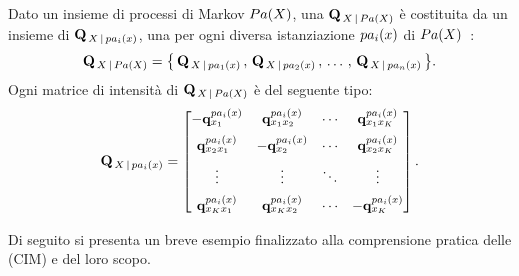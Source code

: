 \begin{definizione}
\label{defn:cim}
Dato un insieme di processi di Markov $Pa(\mathnormal{X})$, una \im*{} \cond*{} $\mathbf{Q}_{\,\mathnormal{X}\,\arrowvert\,Pa(\mathnormal{X})}$ è costituita da un insieme di \im{} $\mathbf{Q}_{\,\mathnormal{X}\,\arrowvert\,pa_i(\mathnormal{x})}$, una per ogni diversa istanziazione $pa_i(\mathnormal{x})$ di $Pa(\mathnormal{X})$~\citep{Stella2012}:
\[
\mathbf{Q}_{\,\mathnormal{X}\,\arrowvert\,Pa(\mathnormal{X})}=\big\{\,\mathbf{Q}_{\,\mathnormal{X}\,\arrowvert\,pa_1(\mathnormal{x})}\,,\,\mathbf{Q}_{\,\mathnormal{X}\,\arrowvert\,pa_2(\mathnormal{x})}\,,\,\dotsc\,,\,\mathbf{Q}_{\,\mathnormal{X}\,\arrowvert\,pa_n(\mathnormal{x})}\,\big\}\text{.}
\]
Ogni matrice di intensità di $\mathbf{Q}_{\,\mathnormal{X}\,\arrowvert\,Pa(\mathnormal{X})}$ è del seguente tipo:\\
\[
\mathbf{Q}_{\,\mathnormal{X}\,\arrowvert\,pa_i(\mathnormal{x})}=
\begin{bmatrix}
-\boldsymbol{\textbf{\text{q}}}_{\mathnormal{x}_1}^{pa_i(\mathnormal{x})}   & \boldsymbol{\textbf{\text{q}}}_{\mathnormal{x}_1\mathnormal{x}_2}^{pa_i(\mathnormal{x})} & \cdots & \boldsymbol{\textbf{\text{q}}}_{\mathnormal{x}_1\mathnormal{x}_K}^{pa_i(\mathnormal{x})}\\[0.5em]
\boldsymbol{\textbf{\text{q}}}_{\mathnormal{x}_2\mathnormal{x}_1}^{pa_i(\mathnormal{x})} & -\boldsymbol{\textbf{\text{q}}}_{\mathnormal{x}_2}^{pa_i(\mathnormal{x})}   & \cdots & \boldsymbol{\textbf{\text{q}}}_{\mathnormal{x}_2\mathnormal{x}_K}^{pa_i(\mathnormal{x})}\\[0.5em]
\vdots           & \vdots           & \ddots & \vdots\\[0.5em]
\boldsymbol{\textbf{\text{q}}}_{\mathnormal{x}_K\mathnormal{x}_1}^{pa_i(\mathnormal{x})} & \boldsymbol{\textbf{\text{q}}}_{\mathnormal{x}_K\mathnormal{x}_2}^{pa_i(\mathnormal{x})} & \cdots & -\boldsymbol{\textbf{\text{q}}}_{\mathnormal{x}_K}^{pa_i(\mathnormal{x})}
\end{bmatrix}
\text{.}
\]
\end{definizione}
Di seguito si presenta un breve esempio finalizzato alla comprensione pratica delle \cim{} (\acs{CIM}) e del loro scopo.
